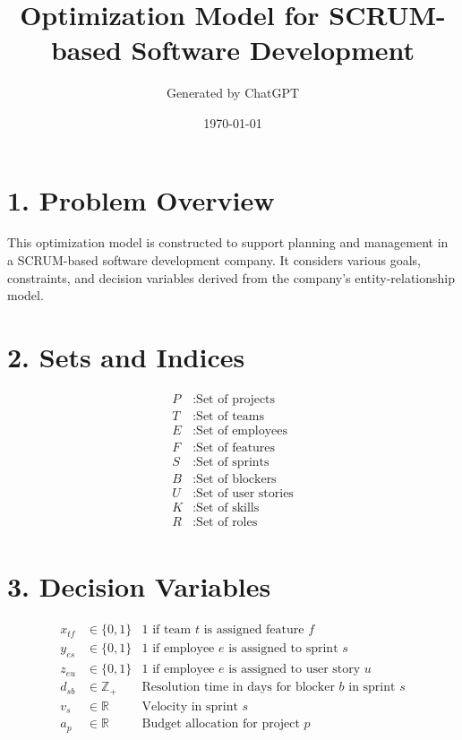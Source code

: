 \documentclass{article}
\title{Optimization Model for SCRUM-based Software Development}
\author{Generated by ChatGPT}
\date{\today}
\begin{document}
\maketitle

\section*{1. Problem Overview}
This optimization model is constructed to support planning and management in a SCRUM-based software development company. It considers various goals, constraints, and decision variables derived from the company’s entity-relationship model.

\section*{2. Sets and Indices}
\begin{align*}
P & : \text{Set of projects} \\
T & : \text{Set of teams} \\
E & : \text{Set of employees} \\
F & : \text{Set of features} \\
S & : \text{Set of sprints} \\
B & : \text{Set of blockers} \\
U & : \text{Set of user stories} \\
K & : \text{Set of skills} \\
R & : \text{Set of roles} \\
\end{align*}

\section*{3. Decision Variables}
\begin{align*}
x_{tf} &\in \{0,1\} & \text{1 if team } t \text{ is assigned feature } f \\
y_{es} &\in \{0,1\} & \text{1 if employee } e \text{ is assigned to sprint } s \\
z_{eu} &\in \{0,1\} & \text{1 if employee } e \text{ is assigned to user story } u \\
d_{sb} &\in \mathbb{Z}_{+} & \text{Resolution time in days for blocker } b \text{ in sprint } s \\
v_s &\in \mathbb{R} & \text{Velocity in sprint } s \\
a_p &\in \mathbb{R} & \text{Budget allocation for project } p \\
\end{align*}
\end{document}
